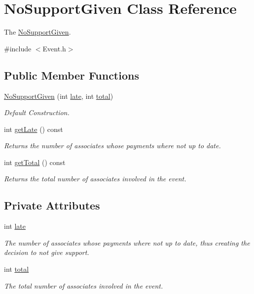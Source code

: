 \hypertarget{classNoSupportGiven}{}\section{No\+Support\+Given Class Reference}
\label{classNoSupportGiven}


The \hyperlink{classNoSupportGiven}{No\+Support\+Given}.  




{\ttfamily \#include $<$Event.\+h$>$}

\subsection*{Public Member Functions}
\begin{DoxyCompactItemize}
\item 
\hyperlink{classNoSupportGiven_a85c20af147aefa12cfa30903d6b6b499}{No\+Support\+Given} (int \hyperlink{classNoSupportGiven_a4f1413a35ad22fe50bc1d5dc08414784}{late}, int \hyperlink{classNoSupportGiven_ab70919acf20a32d05a2b6b4d8753dcb5}{total})
\begin{DoxyCompactList}\small\item\em Default Construction. \end{DoxyCompactList}\item 
int \hyperlink{classNoSupportGiven_a44a7843aed1c26053e622cd3666080e0}{get\+Late} () const
\begin{DoxyCompactList}\small\item\em Returns the number of associates whose payments where not up to date. \end{DoxyCompactList}\item 
int \hyperlink{classNoSupportGiven_a2888ed870de8146fc4ee15c84edf5530}{get\+Total} () const
\begin{DoxyCompactList}\small\item\em Returns the total number of associates involved in the event. \end{DoxyCompactList}\end{DoxyCompactItemize}
\subsection*{Private Attributes}
\begin{DoxyCompactItemize}
\item 
int \hyperlink{classNoSupportGiven_a4f1413a35ad22fe50bc1d5dc08414784}{late}
\begin{DoxyCompactList}\small\item\em The number of associates whose payments where not up to date, thus creating the decision to not give support. \end{DoxyCompactList}\item 
int \hyperlink{classNoSupportGiven_ab70919acf20a32d05a2b6b4d8753dcb5}{total}
\begin{DoxyCompactList}\small\item\em The total number of associates involved in the event. \end{DoxyCompactList}\end{DoxyCompactItemize}


